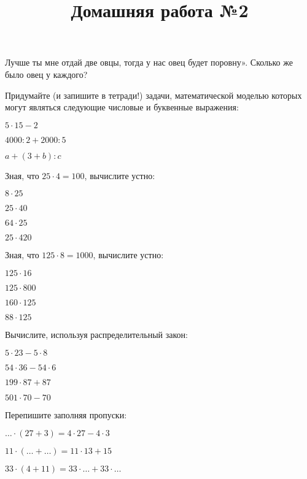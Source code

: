 \begin{class}[number=1]
\begin{listofex}
	Лучше ты мне отдай две овцы, тогда у нас овец будет поровну». Сколько же было овец у
	каждого?
	\item Придумайте (и запишите в тетради!) задачи, математической моделью которых могут
	являться следующие числовые и буквенные выражения:
	\begin{enumcols}[itemcolumns=3]
		\item \( 5\cdot15-2 \)
		\item \( 4000:2+2000:5 \)
		\item \( a+(3+b):c \)
	\end{enumcols}
	\item Зная, что \( 25\cdot4=100 \), вычислите устно:
	\begin{enumcols}[itemcolumns=4]
		\item \( 8\cdot25 \)
		\item \( 25\cdot40 \)
		\item \( 64\cdot25 \)
		\item \( 25\cdot420 \)
	\end{enumcols}
	\item Зная, что \( 125\cdot8=1000 \), вычислите устно:
	\begin{enumcols}[itemcolumns=4]
		\item \( 125\cdot16 \)
		\item \( 125\cdot800 \)
		\item \( 160\cdot125 \)
		\item \( 88\cdot125 \)
	\end{enumcols}
\end{listofex}
\newpage
\title{Домашняя работа №2}
\begin{listofex}
	\item Вычислите, используя распределительный закон:
	\begin{enumcols}[itemcolumns=2]
		\item \( 5\cdot23-5\cdot8 \)
		\item \( 54\cdot36-54\cdot6 \)
		\item \( 199\cdot87+87 \)
		\item \( 501\cdot70-70 \)
	\end{enumcols}
	\item Перепишите заполняя пропуски:
	\begin{enumcols}[itemcolumns=2]
		\item \( {\dots}\cdot(27+3)=4\cdot27-4\cdot3 \)
		\item \( 11\cdot({\dots}+{\dots})=11\cdot13+15 \)
		\item \( 33\cdot(4+11)=33\cdot{\dots}+33\cdot{\dots} \)

\end{enumcols}
\end{listofex}
\end{class}
